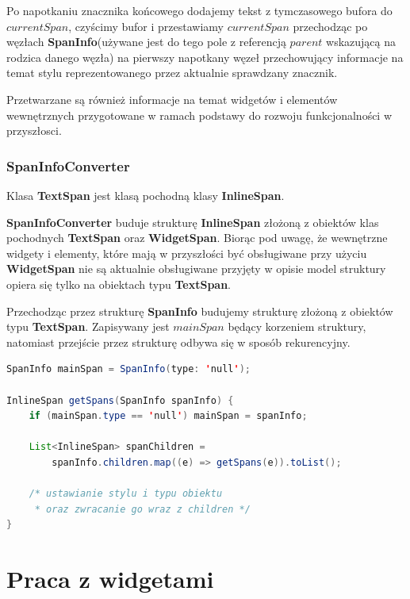 Po napotkaniu znacznika końcowego dodajemy tekst z tymczasowego bufora do $currentSpan$, czyścimy bufor i przestawiamy $currentSpan$ przechodząc po węzłach \textbf{SpanInfo}(używane jest do tego pole z referencją $parent$ wskazującą na rodzica danego węzła) na pierwszy napotkany węzeł przechowujący informacje na temat stylu reprezentowanego przez aktualnie sprawdzany znacznik.

Przetwarzane są również informacje na temat widgetów i elementów wewnętrznych przygotowane w ramach podstawy do rozwoju funkcjonalności w przyszłosci.

\subsubsection{SpanInfoConverter}

Klasa \textbf{TextSpan} jest klasą pochodną klasy \textbf{InlineSpan}.

\textbf{SpanInfoConverter} buduje strukturę \textbf{InlineSpan} złożoną z obiektów klas pochodnych \textbf{TextSpan} oraz \textbf{WidgetSpan}. Biorąc pod uwagę, że wewnętrzne widgety i elementy, które mają w przyszłości być obsługiwane przy użyciu \textbf{WidgetSpan} nie są aktualnie obsługiwane przyjęty w opisie model struktury opiera się tylko na obiektach typu \textbf{TextSpan}.

Przechodząc przez strukturę \textbf{SpanInfo} budujemy strukturę złożoną z obiektów typu \textbf{TextSpan}. Zapisywany jest $mainSpan$ będący korzeniem struktury, natomiast przejście przez strukturę odbywa się w sposób rekurencyjny.

\begin{lstlisting}[language=Java]
SpanInfo mainSpan = SpanInfo(type: 'null');

InlineSpan getSpans(SpanInfo spanInfo) {
    if (mainSpan.type == 'null') mainSpan = spanInfo;

    List<InlineSpan> spanChildren =
        spanInfo.children.map((e) => getSpans(e)).toList();

    /* ustawianie stylu i typu obiektu 
     * oraz zwracanie go wraz z children */
}
\end{lstlisting}

\section{Praca z widgetami}



